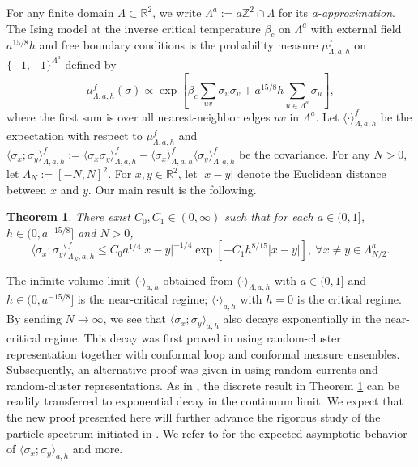 \documentclass[article,12pt,reqno]{amsart}
\newtheorem{theorem}{Theorem}
\begin{document}
For any finite domain $\Lambda \subset \mathbb{R}^2$, we write $\Lambda^a:=a\mathbb{Z}^2 \cap \Lambda$ for its {\it a-approximation}. The Ising model at the inverse critical temperature $\beta_c$ on $\Lambda^a$ with external field $a^{15/8}h$ and free boundary conditions is the probability measure $\mu^f_{\Lambda,a,h}$ on $\{-1,+1\}^{\Lambda^a}$ defined by
\[\mu^f_{\Lambda,a,h}(\sigma) \propto \exp[\beta_c\sum_{uv}\sigma_u\sigma_v+a^{15/8} h\sum_{u\in \Lambda^a}\sigma_u],\]
where the first sum is over all nearest-neighbor edges $uv$ in $\Lambda^a$. Let $\langle \cdot \rangle^f_{\Lambda,a,h}$ be the expectation with respect to $\mu^f_{\Lambda,a,h}$ and $\langle \sigma_x; \sigma_y \rangle^f_{\Lambda,a,h}:=\langle \sigma_x \sigma_y \rangle^f_{\Lambda,a,h}-\langle \sigma_x\rangle^f_{\Lambda,a,h}\langle \sigma_y \rangle^f_{\Lambda,a,h}$ be the covariance. For any $N>0$, let $\Lambda_N:=[-N,N]^2$. For $x,y\in\mathbb{R}^2$, let $|x-y|$ denote the Euclidean distance between $x$ and $y$. Our main result is the following.
\begin{theorem}\label{thm:main}
	There exist $C_0, C_1 \in (0,\infty)$ such that for each $a\in(0,1]$,  $h\in(0,a^{-15/8}]$ and $N>0$,
	\[\langle \sigma_x; \sigma_y \rangle^f_{\Lambda_N,a,h}\leq C_0 a^{1/4}|x-y|^{-1/4}\exp[-C_1 h^{8/15}|x-y|],~\forall x\neq y\in \Lambda_{N/2}^a.\]
\end{theorem}

The infinite-volume limit $\langle \cdot \rangle_{a,h}$ obtained from $\langle \cdot \rangle_{\Lambda, a,h}$ with $a\in(0,1]$ and $h \in (0,a^{-15/8}]$ is the near-critical regime; $\langle \cdot \rangle_{a,h}$ with $h=0$ is the critical regime. By sending $N\rightarrow \infty$, we see that $\langle \sigma_x;\sigma_y \rangle_{a,h}$ also decays exponentially in the near-critical regime. This decay was first proved in \cite{CJN20a} using random-cluster representation together with conformal loop and conformal measure ensembles. Subsequently, an alternative proof was given in \cite{KR22} using random currents and random-cluster representations. As in \cite{CJN20a}, the discrete result in Theorem \ref{thm:main} can be readily transferred to exponential decay in the continuum limit. We expect that the new proof presented here will further advance the rigorous study of the particle spectrum initiated in \cite{camia2020gaussian,camia2021gaussian}. We refer to \cite{camia2021gaussian} for the expected asymptotic behavior of $\langle \sigma_x;\sigma_y \rangle_{a,h}$ and more.
\end{document}
